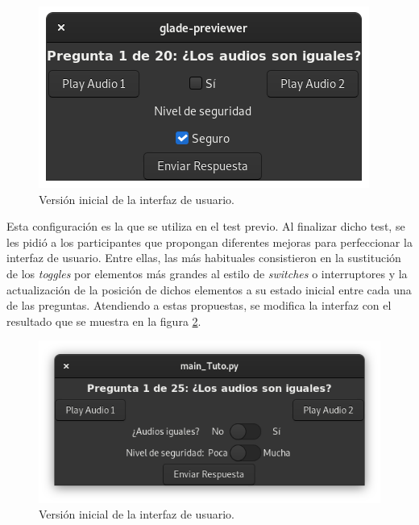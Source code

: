 \documentclass[11pt,a4paper,twoside]{book}
\begin{document}
            \begin{figure}[H]
                \begin{center}
                    \includegraphics[scale=.6]{../imagenes/uiIni.png}
                    \caption{Versión inicial de la interfaz de usuario.}
                    \label{fig:uiIni}
                \end{center}
            \end{figure}
            
            Esta configuración es la que se utiliza en el test previo. Al finalizar dicho test, se les pidió a los participantes que propongan diferentes mejoras para perfeccionar la interfaz de usuario. Entre ellas, las más habituales consistieron en la sustitución de los \textit{toggles} por elementos más grandes al estilo de \textit{switches} o interruptores y la actualización de la posición de dichos elementos a su estado inicial entre cada una de las preguntas.
            Atendiendo a estas propuestas, se modifica la interfaz con el resultado que se muestra en la figura \ref{fig:uiFin}.
            
            \begin{figure}
                \begin{center}
                    \includegraphics[scale=.6]{../imagenes/interFin.png}
                    \caption{Versión inicial de la interfaz de usuario.}
                    \label{fig:uiFin}
                \end{center}
            \end{figure}
            
\end{document}
